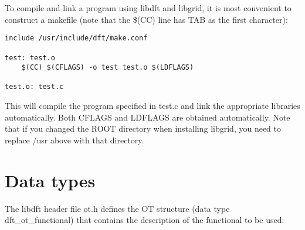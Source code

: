 \documentclass[12pt,letterpaper]{report}
\begin{document}
To compile and link a program using libdft and libgrid, it is most convenient 
to construct a makefile (note that the \$(CC) line has TAB as the first 
character):
\begin{verbatim}
include /usr/include/dft/make.conf

test: test.o
    $(CC) $(CFLAGS) -o test test.o $(LDFLAGS)

test.o: test.c
\end{verbatim}
This will compile the program specified in test.c and link the appropriate 
libraries automatically. Both CFLAGS and LDFLAGS are obtained automatically. Note that if you changed the ROOT directory when installing libgrid, you need to replace /usr above with that directory.

\section{Data types}

The libdft header file ot.h defines the OT structure (data type dft\_ot\_functional) that contains the description of the functional to be used:
\end{document}

